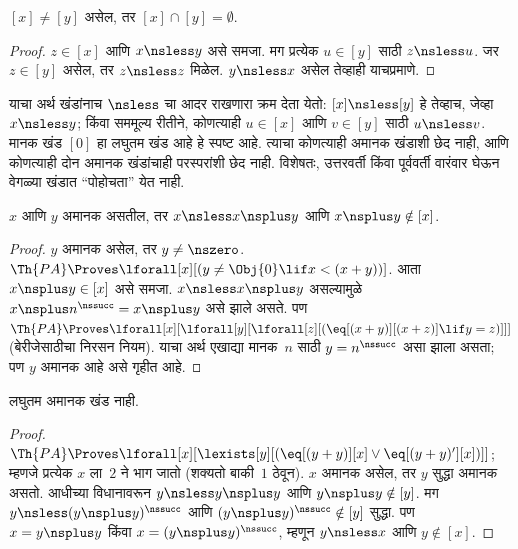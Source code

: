 \begin{cor}
$[x] \neq [y]$ असेल, तर $[x] \cap [y] = \emptyset$.
\end{cor}

\begin{proof}
$z \in [x]$ आणि $x \nsless y$ असे समजा. मग प्रत्येक $u \in [y]$ साठी
$z \nsless u$. जर $z \in [y]$ असेल, तर $z \nsless z$ मिळेल.
$y \nsless x$ असेल तेव्हाही याचप्रमाणे.
\end{proof}

\begin{explain}
याचा अर्थ खंडांनाच $\nsless$ चा आदर राखणारा क्रम देता येतो:
$[x] \nsless [y]$ हे तेव्हाच, जेव्हा $x \nsless y$; किंवा सममूल्य रीतीने,
कोणत्याही $u \in [x]$ आणि $v \in [y]$ साठी $u \nsless v$. मानक खंड
$[0]$ हा लघुतम खंड आहे हे स्पष्ट आहे. त्याचा कोणत्याही अमानक खंडाशी छेद
नाही, आणि कोणत्याही दोन अमानक खंडांचाही परस्परांशी छेद नाही. विशेषतः,
उत्तरवर्ती किंवा पूर्ववर्ती वारंवार घेऊन वेगळ्या खंडात ``पोहोचता'' येत नाही.
\end{explain}

\begin{prop}
$x$ आणि $y$ अमानक असतील, तर $x \nsless x \nsplus y$ आणि
$x \nsplus y \notin [x]$.
\end{prop}

\begin{proof}
$y$ अमानक असेल, तर $y \neq \nszero$. $\Th{PA} \Proves
\lforall[x][(y \neq \Obj{0} \lif x < (x+y))]$. आता
$x \nsplus y \in [x]$ असे समजा. $x \nsless x \nsplus y$ असल्यामुळे
$x \nsplus n^\nssucc = x \nsplus y$ असे झाले असते. पण $\Th{PA} \Proves
\lforall[x][\lforall[y][\lforall[z][(\eq[(x+y)][(x+z)] \lif y = z)]]]$
(बेरीजेसाठीचा निरसन नियम). याचा अर्थ एखाद्या मानक~$n$ साठी
$y = n^\nssucc$ असा झाला असता; पण $y$ अमानक आहे असे गृहीत आहे.
\end{proof}

\begin{prop}
लघुतम अमानक खंड नाही.
\end{prop}

\begin{proof}
$\Th{PA} \Proves \lforall[x][\lexists[y][(\eq[(y+y)][x] \lor
      \eq[(y+y)'][x])]]$; म्हणजे प्रत्येक $x$ ला~$2$ ने भाग जातो
(शक्यतो बाकी~$1$ ठेवून). $x$ अमानक असेल, तर $y$ सुद्धा अमानक असतो.
आधीच्या विधानावरून $y \nsless y \nsplus y$ आणि
$y \nsplus y \notin [y]$. मग $y \nsless (y \nsplus y)^\nssucc$ आणि
$(y \nsplus y)^\nssucc \notin [y]$ सुद्धा. पण $x = y \nsplus y$ किंवा
$x = (y \nsplus y)^\nssucc$, म्हणून $y \nsless x$ आणि $y \notin [x]$.
\end{proof}

